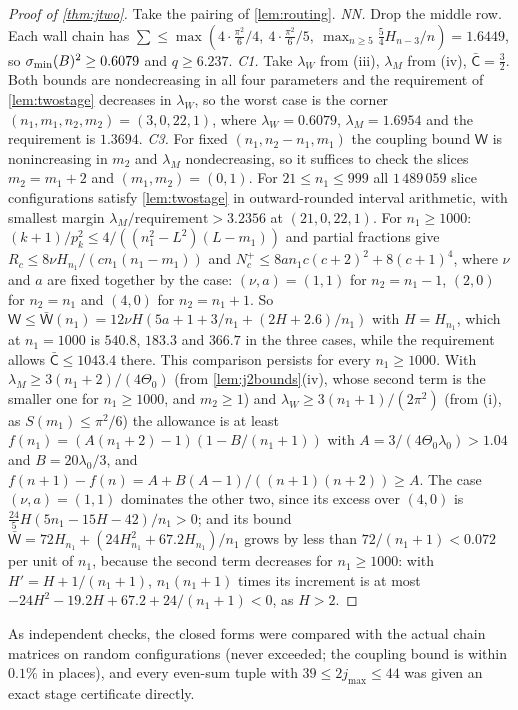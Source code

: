 \begin{proof}[Proof of \cref{thm:jtwo}]
Take the pairing of \cref{lem:routing}.
\emph{NN.} Drop the middle row. Each wall chain has
$\sum\le\max(4\cdot\frac{\pi^2}6/4,\ 4\cdot\frac{\pi^2}6/5,\ \max_{n\ge5}\frac54H_{n-3}/n)=1.6449$,
so $\sigma_{\min}(B)^2\ge0.6079$ and $q\ge6.237$.
\emph{C1.} Take $\lambda_W$ from (iii), $\lambda_M$ from (iv), $\bar{\mathsf C}=\frac32$. Both bounds are
nondecreasing in all four parameters and the requirement of \cref{lem:twostage} decreases in
$\lambda_W$, so the worst case is the corner $(n_1,m_1,n_2,m_2)=(3,0,22,1)$, where $\lambda_W=0.6079$,
$\lambda_M=1.6954$ and the requirement is $1.3694$.
\emph{C3.} For fixed $(n_1,n_2-n_1,m_1)$ the coupling bound $\mathsf W$ is nonincreasing in $m_2$
and $\lambda_M$ nondecreasing, so it suffices to check the slices $m_2=m_1+2$ and
$(m_1,m_2)=(0,1)$. For $21\le n_1\le999$ all $1\,489\,059$ slice configurations satisfy
\cref{lem:twostage} in outward-rounded interval arithmetic, with smallest margin
$\lambda_M/\text{requirement}>3.2356$ at $(21,0,22,1)$. For $n_1\ge1000$:
$(k+1)/p_k^2\le4/((n_1^2-L^2)(L-m_1))$ and partial fractions give
$R_c\le8\nu H_{n_1}/(cn_1(n_1-m_1))$ and $N_c^+\le8an_1c(c+2)^2+8(c+1)^4$, where $\nu$ and $a$
are fixed together by the case: $(\nu,a)=(1,1)$ for $n_2=n_1-1$, $(2,0)$ for $n_2=n_1$ and
$(4,0)$ for $n_2=n_1+1$. So $\mathsf W\le\bar{\mathsf W}(n_1)=12\nu H(5a+1+3/n_1+
(2H+2.6)/n_1)$ with $H=H_{n_1}$, which at $n_1=1000$ is $540.8$, $183.3$ and $366.7$ in the
three cases, while the requirement allows
$\bar{\mathsf C}\le1043.4$ there. This comparison persists for every $n_1\ge1000$. With
$\lambda_M\ge3(n_1+2)/(4\Theta_0)$ (from \cref{lem:j2bounds}(iv), whose second term is the
smaller one for $n_1\ge1000$, and $m_2\ge1$) and $\lambda_W\ge3(n_1+1)/(2\pi^2)$ (from (i),
as $S(m_1)\le\pi^2/6$) the allowance is at least
$f(n_1)=(A(n_1+2)-1)(1-B/(n_1+1))$ with $A=3/(4\Theta_0\lambda_0)>1.04$ and $B=20\lambda_0/3$, and
$f(n+1)-f(n)=A+B(A-1)/((n+1)(n+2))\ge A$. The case $(\nu,a)=(1,1)$ dominates the other two,
since its excess over $(4,0)$ is $\frac{24}5H(5n_1-15H-42)/n_1>0$; and its bound
$\bar{\mathsf W}=72H_{n_1}+(24H_{n_1}^2+67.2H_{n_1})/n_1$ grows by less than
$72/(n_1+1)<0.072$ per unit of $n_1$, because the second term decreases for $n_1\ge1000$: with
$H'=H+1/(n_1+1)$, $n_1(n_1+1)$ times its increment is at most
$-24H^2-19.2H+67.2+24/(n_1+1)<0$, as $H>2$.
\end{proof}

As independent checks, the closed forms were compared with the actual chain matrices on random
configurations (never exceeded; the coupling bound is within $0.1\%$ in places), and every
even-sum tuple with $39\le2j_{\max}\le44$ was given an exact stage certificate directly.

